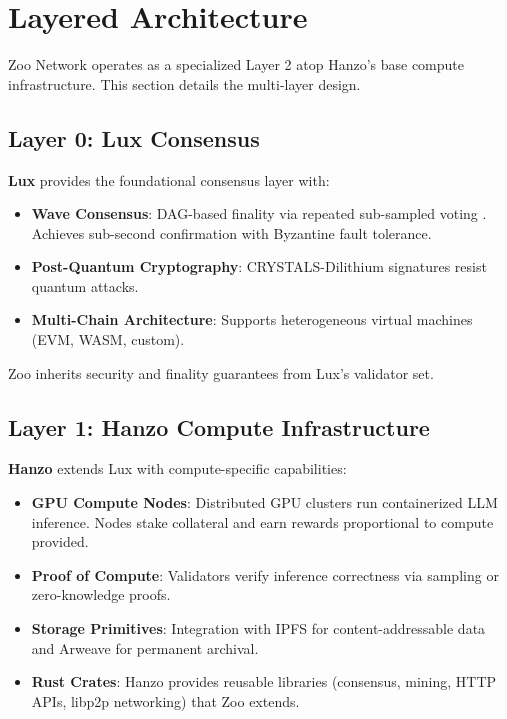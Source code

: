 \section{Layered Architecture}


Zoo Network operates as a specialized Layer 2 atop Hanzo's base compute infrastructure. This section details the multi-layer design.

\subsection{Layer 0: Lux Consensus}

\textbf{Lux} \cite{lux2025whitepaper} provides the foundational consensus layer with:

\begin{itemize}[leftmargin=*]
\item \textbf{Wave Consensus}: DAG-based finality via repeated sub-sampled voting \cite{rocket2020snowman}. Achieves sub-second confirmation with Byzantine fault tolerance.
\item \textbf{Post-Quantum Cryptography}: CRYSTALS-Dilithium signatures resist quantum attacks.
\item \textbf{Multi-Chain Architecture}: Supports heterogeneous virtual machines (EVM, WASM, custom).
\end{itemize}

Zoo inherits security and finality guarantees from Lux's validator set.

\subsection{Layer 1: Hanzo Compute Infrastructure}

\textbf{Hanzo} \cite{hanzo2025paper} extends Lux with compute-specific capabilities:

\begin{itemize}[leftmargin=*]
\item \textbf{GPU Compute Nodes}: Distributed GPU clusters run containerized LLM inference. Nodes stake collateral and earn rewards proportional to compute provided.
\item \textbf{Proof of Compute}: Validators verify inference correctness via sampling or zero-knowledge proofs.
\item \textbf{Storage Primitives}: Integration with IPFS for content-addressable data and Arweave for permanent archival.
\item \textbf{Rust Crates}: Hanzo provides reusable libraries (consensus, mining, HTTP APIs, libp2p networking) that Zoo extends.
\end{itemize}

